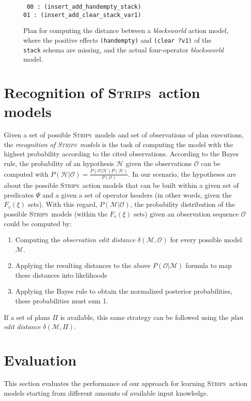 \documentclass[3p,times]{elsarticle}
\newcommand{\strips}{\textsc{Strips}}     %
\begin{document}
\begin{figure}[hbt!]
{\tt\small
00 : (insert\_add\_handempty\_stack)\\
01 : (insert\_add\_clear\_stack\_var1)
}
 \caption{\small Plan for computing the distance between a \emph{blocksworld} action model, where the positive effects {\tt\small (handempty)} and {\tt\small (clear ?v1)} of the {\tt\small stack} schema are missing, and the actual four-operator {\em blocksworld} model.}
\label{fig:plan-mdistance}
\end{figure}



\section{Recognition of \strips\ action models}
\label{sec:Section7}
Given a set of possible \strips\ models and set of observations of plan executions, the {\em recognition of \strips\ models} is the task of computing the model with the highest probability according to the cited observations. According to the Bayes rule, the probability of an hypothesis $\mathcal{H}$ given the observations $\mathcal{O}$ can be computed with $P(\mathcal{H}|\mathcal{O})=\frac{P(\mathcal{O}|\mathcal{H})P(\mathcal{H})}{P(\mathcal{O})}$. In our scenario, the hypotheses are about the possible \strips\ action models that can be built within a given set of predicates $\Psi$ and a given a set of operator headers (in other words, given the $F_v(\xi)$ sets). With this regard, $P(\mathcal{M}|\mathcal{O})$, the probability distribution of the possible \strips\ models (within the $F_v(\xi)$ sets) given an observation sequence $\mathcal{O}$ could be computed by:
\begin{enumerate}
\item Computing the {\em observation edit distance} $\delta(\mathcal{M},\mathcal{O})$ for every possible model $\mathcal{M}$.
\item Applying the resulting distances to the above $P(\mathcal{O}|\mathcal{M})$ formula to map these distances into likelihoods
\item Applying the Bayes rule to obtain the normalized posterior probabilities, these probabilities must sum 1.
\end{enumerate}

If a set of plans $\Pi$ is available, this same strategy can be followed using the {\em plan edit distance} $\delta(\mathcal{M},\Pi)$.



\section{Evaluation}
\label{sec:Section8}
This section evaluates the performance of our approach for learning \strips\ action models starting from different amounts of available input knowledge.
\end{document}
